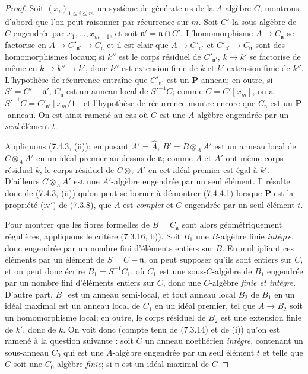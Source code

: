 \begin{proof}
Soit $(x_i)_{1\leqslant i\leqslant m}$ un système de générateurs de la
$A$-algèbre $C$; montrons d'abord que l'on peut raisonner par récurrence sur
$m$. Soit $C'$ la sous-algèbre de $C$ engendrée par
$x_1,\ldots,x_{m-1}$, et soit $\mathfrak n'=\mathfrak n\cap C'$.
L'homomorphisme $A\to C_{\mathfrak n}$ se factorise en
$A\to C'_{\mathfrak n'}\to C_{\mathfrak n}$ et il est clair que
$A\to C'_{\mathfrak n'}$ et $C'_{\mathfrak n'}\to C_{\mathfrak n}$ sont
des homomorphismes locaux; si $k''$ est le corps résiduel de
$C'_{\mathfrak n'}$, $k\to k'$ se factorise de même en
$k\to k''\to k'$, donc $k''$ est extension finie de $k$ et $k'$ extension
finie de $k''$. L'hypothèse de récurrence entraîne que
$C'_{\mathfrak n'}$ est un $\boldsymbol P$-anneau; en outre, si
$S'=C'-\mathfrak n'$, $C_{\mathfrak n}$ est un anneau local de
$S'^{-1}C$; comme $C=C'[x_m]$, on a
$S'^{-1}C=C'_{\mathfrak n'}[x_m/1]$ et l'hypothèse de récurrence montre
encore que $C_{\mathfrak n}$ est un $\boldsymbol P$-anneau. On est ainsi
ramené au cas où $C$ est une $A$-algèbre engendrée par un \emph{seul}
élément $t$.

Appliquons (7.4.3, (ii)); en posant $A'=\widehat A$,
$B'=B\otimes_A A'$ est un anneau local de $C\otimes_A A'$ en un idéal
premier au-dessus de $\mathfrak n$; comme $A$ et $A'$ ont même corps
résiduel $k$, le corps résiduel de $C\otimes_A A'$ en cet idéal premier est
égal à $k'$. D'ailleurs $C\otimes_A A'$ est une $A'$-algèbre engendrée par
un seul élément. Il résulte donc de (7.4.3, (ii)) qu'on peut se borner à
démontrer (7.4.4.1) lorsque $\boldsymbol P$ est la propriété (iv$'$) de
(7.3.8), que $A$ est \emph{complet} et $C$ engendrée par un seul élément
$t$.

Pour montrer que les fibres formelles de $B=C_{\mathfrak n}$ sont alors
géométriquement régulières, appliquons le critère (7.3.16, b)). Soit $B_1$
une $B$-algèbre finie \emph{intègre}, donc engendrée par un nombre fini
d'éléments entiers sur $B$. En multipliant ces éléments par un élément de
$S=C-\mathfrak n$, on peut supposer qu'ils sont entiers sur $C$, et on peut
donc écrire $B_1=S^{-1}C_1$, où $C_1$ est une sous-$C$-algèbre de $B_1$
engendrée par un nombre fini d'éléments entiers sur $C$, donc une
$C$-algèbre \emph{finie et intègre}. D'autre part, $B_1$ est un anneau
semi-local, et tout anneau local $B_2$ de $B_1$ en un idéal maximal est un
anneau local de $C_1$ en un idéal premier, tel que $A\to B_2$ soit un
homomorphisme local; en outre, le corps résiduel de $B_2$ est une extension
finie de $k'$, donc de $k$. On voit donc (compte tenu de (7.3.14) et de (i))
qu'on est ramené à la question suivante : soit $C$ un anneau noethérien
\emph{intègre}, contenant un sous-anneau $C_0$ qui est une $A$-algèbre
engendrée par un seul élément $t$ et telle que $C$ soit une $C_0$-algèbre
\emph{finie}; si $\mathfrak n$ est un idéal maximal de $C$


\end{proof}
